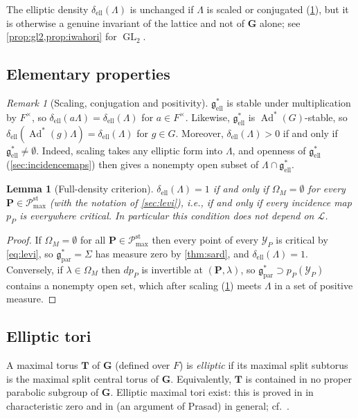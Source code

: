 \documentclass[11pt,reqno]{amsart}
\numberwithin{equation}{section}
\theoremstyle{plain}
\newtheorem{lemma}[theorem]{Lemma}
\theoremstyle{definition}
\theoremstyle{remark}
\newtheorem{remark}[theorem]{Remark}
\theoremstyle{plain}
\newcommand{\Lat}{\mathcal{L}}   %
\newcommand{\dLat}{\Lambda}      %
\newcommand{\bG}{\mathbf{G}}     %
\newcommand{\bP}{\mathbf{P}}     %
\newcommand{\bT}{\mathbf{T}}     %
\newcommand{\g}{\mathfrak{g}}    %
\newcommand{\gd}{\mathfrak{g}^*} %
\newcommand{\Ell}[2][]{#2_{#1\mathrm{ell}}}   %
\newcommand{\Par}[2][]{#2_{#1\mathrm{par}}}
\newcommand{\elld}[2][]{\delta_{\mathrm{ell}}^{#1}(#2)}  %
\newcommand{\Pc}{\mathscr{P}^{\mathrm{st}}_{\mathrm{max}}}    %
\DeclareMathOperator{\Ad}{Ad}
\DeclareMathOperator{\GL}{GL}
\newcommand{\lf}{\lambda}
\newcommand{\Inc}{\mathcal{Y}}
\newcommand{\Crv}{\Sigma}
\begin{document}
The elliptic density $\elld{\dLat}$ is unchanged if $\dLat$ is scaled or conjugated
(\cref{rem:ball}), but it is otherwise a genuine invariant of the
lattice and not of $\bG$ alone; see \cref{prop:gl2,prop:iwahori} for $\GL_2$.

\subsection{Elementary properties}

\begin{remark}[Scaling, conjugation and positivity]\label{rem:ball}
$\Ell{\gd}$ is stable under multiplication by $F^\times$, so
$\elld{a\dLat}=\elld{\dLat}$ for $a\in F^\times$. Likewise, $\Ell{\gd}$ is
$\Ad^*(G)$-stable, so $\elld{\Ad^*(g)\dLat}=\elld{\dLat}$ for $g\in G$.
Moreover, $\elld{\dLat}>0$ if and only if $\Ell{\gd}\ne\emptyset$.
Indeed, scaling takes any elliptic form into $\dLat$, and openness of
$\Ell{\gd}$ (\cref{sec:incidencemaps}) then gives a nonempty open
subset of $\dLat\cap\Ell{\gd}$.
\end{remark}


\begin{lemma}[Full-density criterion]\label{lem:one}
$\elld{\dLat}=1$ if and only if $\Omega_M=\emptyset$ for every
$\bP\in\Pc$ (with the notation of \cref{sec:levi}), i.e., if and only if
every incidence map $p_P$ is everywhere critical. In particular this
condition does not depend on $\Lat$.
\end{lemma}

\begin{proof}
If $\Omega_M=\emptyset$ for all $\bP\in\Pc$ then every point of every
$\Inc_P$ is critical by \eqref{eq:levi}, so $\Par{\gd}=\Crv$ has measure zero
by \cref{thm:sard}, and $\elld{\dLat}=1$. Conversely, if
$\lf\in\Omega_M$ then $dp_P$ is invertible at $(\bP,\lf)$, so
$\Par{\gd}\supset p_P(\Inc_P)$ contains a nonempty open set, which after
scaling (\cref{rem:ball}) meets $\dLat$ in a set of positive measure.
\end{proof}

\subsection{Elliptic tori}
A maximal torus $\bT$ of $\bG$ (defined over
$F$) is \emph{elliptic} if its maximal split subtorus is the maximal
split central torus of $\bG$. Equivalently, $\bT$ is contained in no
proper parabolic subgroup of $\bG$.
Elliptic maximal tori exist: this is proved in \cite[Theorem~6.21]{MR1278263}
in characteristic zero and in \cite[\S2.4]{MR2214792} (an argument of
Prasad) in general; cf.~\cite[Theorem~5.3]{MR4617942}.
\end{document}
